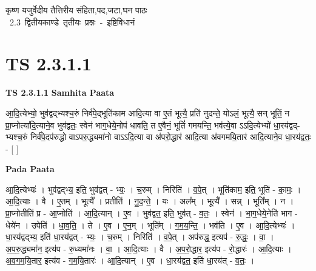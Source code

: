 \documentclass[17pt]{extarticle}
\begin{document}
\begin{titlepage}
    \begin{center}
 
\begin{sanskrit}
    { \Large
    कृष्ण यजुर्वेदीय तैत्तिरीय संहिता,पद,जटा,घन पाठः 
    }
    \\
    \vspace{2.5cm}
    \mbox{ \Large
    2.3     द्वितीयकाण्डे तृतीयः प्रश्नः - इष्टिविधानं   }
\end{sanskrit}
\end{center}

\end{titlepage}
\tableofcontents
{}
\pagebreak


\section{ TS 2.3.1.1 }

\textbf{TS 2.3.1.1 } \newline
\textbf{Samhita Paata} \newline

आ॒दि॒त्येभ्यो॒ भुव॑द्वद्भ्यश्च॒रुं निर्व॑पे॒द्भूति॑काम आदि॒त्या वा ए॒तं भूत्यै॒ प्रति॑ नुदन्ते॒ योऽलं॒ भूत्यै॒ सन् भूतिं॒ न प्रा॒प्नोत्या॑दि॒त्याने॒व भुव॑द्वतः॒ स्वेन॑ भाग॒धेये॒नोप॑ धावति॒ त ए॒वैनं॒ भूतिं॑ गमयन्ति॒ भव॑त्ये॒वा ऽऽदि॒त्येभ्यो॑ धा॒रय॑द्वद्-भ्यश्च॒रुं निर्व॑पे॒दप॑रुद्धो वाऽपरु॒द्ध्यमा॑नो वाऽऽदि॒त्या वा अ॑परो॒द्धार॑ आदि॒त्या अ॑वगमयि॒तार॑ आदि॒त्याने॒व धा॒रय॑द्वतः॒ - [  ] \newline

\textbf{Pada Paata} \newline

आ॒दि॒त्येभ्यः॑ । भुव॑द्वद्भ्य॒ इति॒ भुव॑द्वत् - भ्यः॒ । च॒रुम् । निरिति॑ । व॒पे॒त् । भूति॑काम॒ इति॒ भूति॑ - का॒मः॒ । आ॒दि॒त्याः । वै । ए॒तम् । भूत्यै᳚ । प्रतीति॑ । नु॒द॒न्ते॒ । यः । अल᳚म् । भूत्यै᳚ । सन्न् । भूति᳚म् । न । प्रा॒प्नोतीति॑ प्र - आ॒प्नोति॑ । आ॒दि॒त्यान् । ए॒व । भुव॑द्वत॒ इति॒ भुव॑त् - व॒तः॒ । स्वेन॑ । भा॒ग॒धेये॒नेति॑ भाग - धेये॑न । उपेति॑ । धा॒व॒ति॒ । ते । ए॒व । ए॒न॒म् । भूति᳚म् । ग॒म॒य॒न्ति॒ । भव॑ति । ए॒व । आ॒दि॒त्येभ्यः॑ । धा॒रय॑द्वद्भ्य॒ इति॑ धा॒रय॑द्वत् - भ्यः॒ । च॒रुम् । निरिति॑ । व॒पे॒त् । अप॑रुद्ध॒ इत्यप॑ - रु॒द्धः॒ । वा॒ । अ॒प॒रु॒द्ध्यमा॑न॒ इत्य॑प - रु॒ध्यमा॑नः । वा॒ । आ॒दि॒त्याः । वै । अ॒प॒रो॒द्धार॒ इत्य॑प - रो॒द्धारः॑ । आ॒दि॒त्याः । अ॒व॒ग॒म॒यि॒तार॒ इत्य॑व - ग॒म॒यि॒तारः॑ । आ॒दि॒त्यान् । ए॒व । धा॒रय॑द्वत॒ इति॑ धा॒रय॑त् - व॒तः॒ ।  \newline
\end{document}

